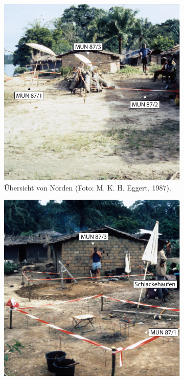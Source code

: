 \begin{figure}[!tb]
 \centering
 \begin{subfigure}[t]{\columnwidth}
 \centering
 \includegraphics[width = \textwidth]{fig/MUN87_E87-038-31.pdf}
 \caption{Übersicht von Norden (Foto: M. K. H. Eggert, 1987).}
 \label{fig:MUN87_Übersicht1}
 \end{subfigure}\hfill
 \begin{subfigure}[t]{\columnwidth}
 \centering
 \includegraphics[width = \textwidth]{fig/MUN87_E87-038-36.pdf}

\end{subfigure}
\end{figure}
